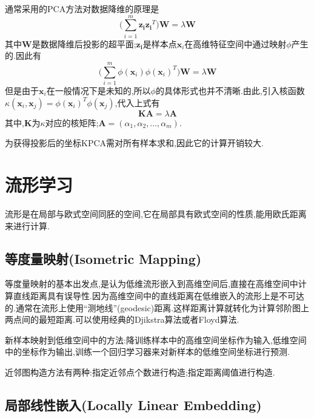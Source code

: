 通常采用的PCA方法对数据降维的原理是
\begin{equation}
\Big(\sum_{i=1}^m\mathbf{z_iz_i}^T\Big)\mathbf{W}=\lambda\mathbf{W}
\end{equation}
其中$\mathbf{W}$是数据降维后投影的超平面;$\mathbf{z_i}$是样本点$\mathbf{x}_i$在高维特征空间中通过映射$\phi$产生的.因此有
\begin{equation}
\Big(\sum_{i=1}^m\phi(\mathbf{x}_i)\phi(\mathbf{x}_i)^T\Big)\mathbf{W}=\lambda\mathbf{W}
\end{equation}
但是由于$\mathbf{x}_i$在一般情况下是未知的,所以$\phi$的具体形式也并不清晰.由此,引入核函数$\kappa(\mathbf{x}_i, \mathbf{x}_j)=\phi(\mathbf{x}_i)^T\phi(\mathbf{x}_j)$,代入上式有
\begin{equation}
\mathbf{KA}=\lambda\mathbf{A}
\end{equation}
其中,$\mathbf{K}$为$\kappa$对应的核矩阵;$\mathbf{A}=(\alpha_1, \alpha_2, \dots, \alpha_m)$.

为获得投影后的坐标KPCA需对所有样本求和,因此它的计算开销较大.

\section{流形学习}

流形是在局部与欧式空间同胚的空间,它在局部具有欧式空间的性质,能用欧氏距离来进行计算.

\subsection{等度量映射(Isometric Mapping)}

等度量映射的基本出发点,是认为低维流形嵌入到高维空间后,直接在高维空间中计算直线距离具有误导性.因为高维空间中的直线距离在低维嵌入的流形上是不可达的.通常在流形上使用``测地线''(geodesic)距离.这样距离计算就转化为计算邻阶图上两点间的最短距离.可以使用经典的Djikstra算法或者Floyd算法.

新样本映射到低维空间中的方法:降训练样本中的高维空间坐标作为输入,低维空间中的坐标作为输出,训练一个回归学习器来对新样本的低维空间坐标进行预测.

近邻图构造方法有两种:指定近邻点个数进行构造;指定距离阈值进行构造.

\subsection{局部线性嵌入(Locally Linear Embedding)}


